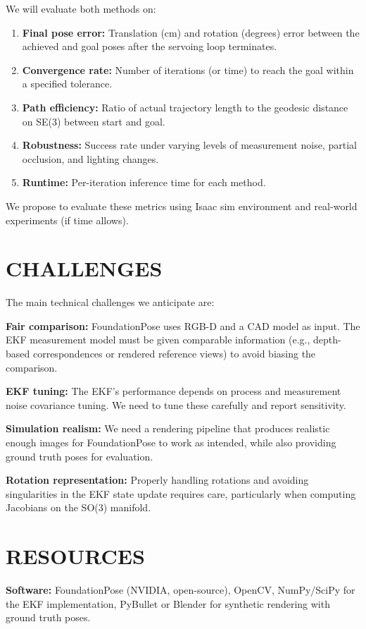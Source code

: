 \documentclass[letterpaper, 10 pt, conference]{ieeeconf}  %
\begin{document}
We will evaluate both methods on:
\begin{enumerate}
    \item \textbf{Final pose error:} Translation (cm) and rotation (degrees) error between the achieved and goal poses after the servoing loop terminates.
    \item \textbf{Convergence rate:} Number of iterations (or time) to reach the goal within a specified tolerance.
    \item \textbf{Path efficiency:} Ratio of actual trajectory length to the geodesic distance on SE(3) between start and goal.
    \item \textbf{Robustness:} Success rate under varying levels of measurement noise, partial occlusion, and lighting changes.
    \item \textbf{Runtime:} Per-iteration inference time for each method.
\end{enumerate}
We propose to evaluate these metrics using Isaac sim environment and real-world experiments (if time allows).

\section{CHALLENGES}

The main technical challenges we anticipate are:

\textbf{Fair comparison:} FoundationPose uses RGB-D and a CAD model as input. The EKF measurement model must be given comparable information (e.g., depth-based correspondences or rendered reference views) to avoid biasing the comparison.

\textbf{EKF tuning:} The EKF's performance depends on process and measurement noise covariance tuning. We need to tune these carefully and report sensitivity.

\textbf{Simulation realism:} We need a rendering pipeline that produces realistic enough images for FoundationPose to work as intended, while also providing ground truth poses for evaluation.

\textbf{Rotation representation:} Properly handling rotations and avoiding singularities in the EKF state update requires care, particularly when computing Jacobians on the SO(3) manifold.

\section{RESOURCES}

\textbf{Software:} FoundationPose (NVIDIA, open-source), OpenCV, NumPy/SciPy for the EKF implementation, PyBullet or Blender for synthetic rendering with ground truth poses.
\end{document}
